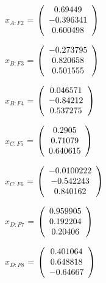 \begin{description}
$\hat{x}_{A:F2}$ = $\left( \begin{array} {ccc}    0.69449 \\  -0.396341 \\   0.600498
\end{array} \right)\\ \\$

$\hat{x}_{B:F3}$ = $\left( \begin{array} {ccc}  -0.273795 \\   0.820658 \\   0.501555
\end{array} \right)\\ \\$

$\hat{x}_{B:F4}$ = $\left( \begin{array} {ccc}   0.046571 \\   -0.84212 \\   0.537275
\end{array} \right)\\ \\$

$\hat{x}_{C:F5}$ = $\left( \begin{array} {ccc}     0.2905 \\    0.71079 \\   0.640615
\end{array} \right)\\ \\$

$\hat{x}_{C:F6}$ = $\left( \begin{array} {ccc} -0.0100222 \\  -0.542243 \\   0.840162
\end{array} \right)\\ \\$

$\hat{x}_{D:F7}$ = $\left( \begin{array} {ccc}   0.959905 \\   0.192204 \\    0.20406
\end{array} \right)\\ \\$

$\hat{x}_{D:F8}$ = $\left( \begin{array} {ccc}   0.401064 \\   0.648818 \\   -0.64667
\end{array} \right)\\ \\$


\end{description}
